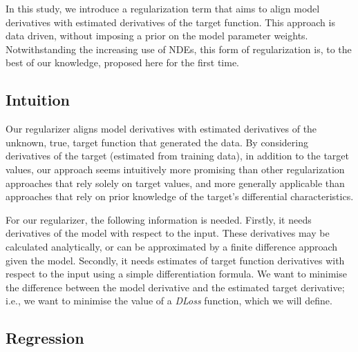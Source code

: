 \documentclass{article}
\newcommand{\kibitz}[2]{\ifnum\Comments=1\textcolor{#1}{#2}\fi}
\newcommand{\kizito}[1]{\kibitz{red} {[Kizito: #1]}}
\newcommand{\enrico}[1]{\kibitz{blue} {[Enrico: #1]}}
\begin{document}
In this study, we introduce a regularization term that aims to align model derivatives with estimated derivatives of the target function.
This approach is data driven, without imposing a prior on the model parameter weights. %
Notwithstanding the increasing use of NDEs, this form of regularization is, to the best of our knowledge, proposed here for the first time.

\subsection{Intuition}
Our regularizer aligns model derivatives with estimated derivatives of the unknown, true, target function that generated the data.
By considering derivatives of the target (estimated from training data), in addition to the target values, our approach seems intuitively more promising than other regularization approaches that rely solely on target values, and more generally applicable than approaches that rely on prior knowledge of the target's differential characteristics.

For our regularizer, the following information is needed.
Firstly, it needs derivatives of the model with respect to the input.
These derivatives may be calculated analytically, or can be approximated by a finite difference approach given the model.
Secondly, it needs estimates of target function derivatives with respect to the input using a simple differentiation formula. 
We want to minimise the difference between the model derivative and the estimated target derivative; i.e., we want to minimise the value of a \emph{DLoss} function, which we will define.

\subsection{Regression}
\label{subsec_regressiontasks}
\end{document}
